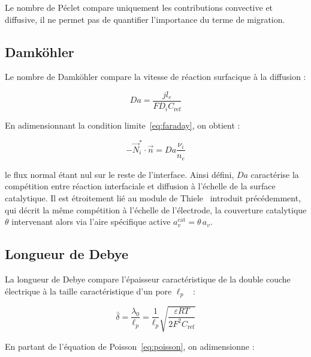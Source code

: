 Le nombre de Péclet compare uniquement les contributions convective et diffusive, 
il ne permet pas de quantifier l'importance du terme de migration.

\subsection*{Damköhler}

Le nombre de Damköhler compare la vitesse de réaction surfacique à la diffusion :

\begin{equation}
Da = \frac{j l_e}{F D_i C_{\text{ref}}}
\end{equation}

En adimensionnant la condition limite~\eqref{eq:faraday}, on obtient :

\begin{equation*}
-\vec{N}_i^* \cdot \vec{n} = Da \frac{\nu_i}{n_e}
\end{equation*}

le flux normal étant nul sur le reste de l'interface. Ainsi défini, $Da$ caractérise 
la compétition entre réaction interfaciale et diffusion à l'échelle de la surface 
catalytique. Il est étroitement lié au module de Thiele~\cite{wanPotentialDependentThiele} 
introduit précédemment, qui décrit la même compétition à l'échelle de l'électrode, 
la couverture catalytique $\theta$ intervenant alors via l'aire spécifique active 
$a_v^{\text{cat}} = \theta\, a_v$.

\subsection*{Longueur de Debye}

La longueur de Debye compare l'épaisseur caractéristique de la double
couche électrique à la taille caractéristique d'un pore $\ell_p$~\cite{dickinsonElectroneutralityApproximationElectrochemistry2011} :

\begin{equation}
\bar{\delta} = \frac{\lambda_0}{\ell_p}
= \frac{1}{\ell_p}
\sqrt{\frac{\varepsilon RT}{2F^2 C_{\text{ref}}}}
\end{equation}

En partant de l'équation de Poisson~\eqref{eq:poisson}, on adimensionne :


